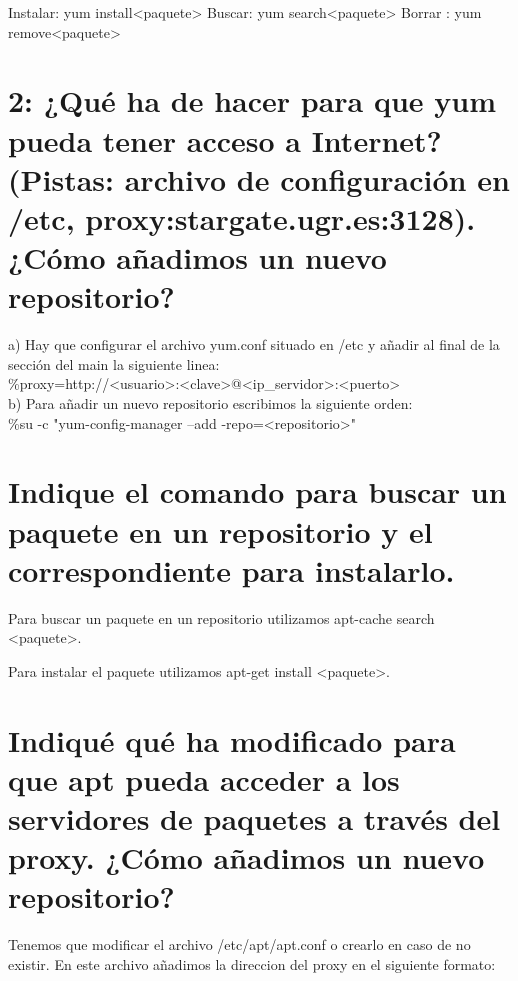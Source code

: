 Instalar: yum install<paquete>
Buscar:   yum search<paquete>
Borrar :  yum remove<paquete>

\section{2: ¿Qué ha de hacer para que yum pueda tener acceso a Internet?(Pistas: archivo de configuración en /etc, proxy:stargate.ugr.es:3128). ¿Cómo añadimos un nuevo repositorio? \cite{02c01}}

a) Hay que configurar el archivo yum.conf situado en /etc y añadir al final de la sección del main la siguiente linea:\\
\%proxy=http://<usuario>:<clave>@<ip\_servidor>:<puerto>\\


b) Para añadir un nuevo repositorio escribimos la siguiente orden:\\
\%su -c "yum-config-manager --add -repo=<repositorio>"\\



\section{Indique el comando para buscar un paquete en un repositorio y el correspondiente para instalarlo.}

Para buscar un paquete en un repositorio utilizamos apt-cache search <paquete>.

Para instalar el paquete utilizamos apt-get install <paquete>.
\clearpage
\section{Indiqué qué ha modificado para que apt pueda acceder a los servidores de paquetes a través del proxy. ¿Cómo añadimos un nuevo repositorio? \cite{04c01} \cite{04c02}}

Tenemos que modificar el archivo /etc/apt/apt.conf o crearlo en caso de no existir. En este archivo añadimos la direccion del proxy en el siguiente formato:\\

